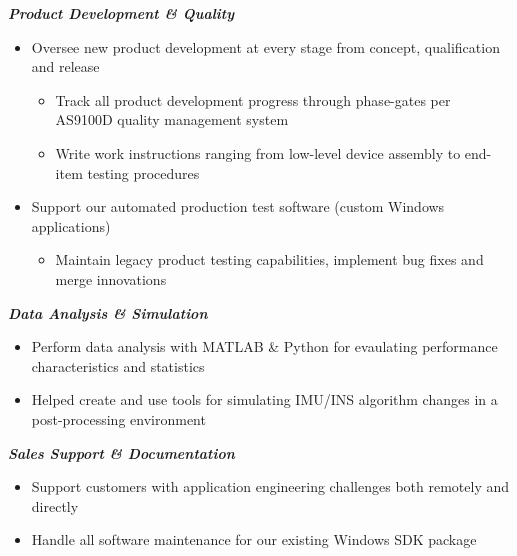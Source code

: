 \documentclass[]{article}
\begin{document}
\begin{singlespace}
\noindent\textbf{\emph{Product Development \& Quality}}
\vspace{-2mm}
\begin{itemize}
    \setlength\itemsep{0em}
    \item Oversee new product development at every stage from concept, qualification and release
    \vspace{-2mm}
    \begin{itemize}
        \setlength\itemsep{0em}
        \item Track all product development progress through phase-gates per AS9100D quality management system
        \item Write work instructions ranging from low-level device assembly to end-item testing procedures
    \end{itemize}
    \item Support our automated production test software (custom Windows applications)
    \vspace{-2mm}
    \begin{itemize}
        \setlength\itemsep{0em}
        \item Maintain legacy product testing capabilities, implement bug fixes and merge innovations
    \end{itemize}
\end{itemize}

\noindent\textbf{\emph{Data Analysis \& Simulation}}
\vspace{-2mm}
\begin{itemize}
    \setlength\itemsep{0em}
    \item Perform data analysis with MATLAB \& Python for evaulating performance characteristics and statistics
    \item Helped create and use tools for simulating IMU/INS algorithm changes in a post-processing environment
\end{itemize}

\noindent\textbf{\emph{Sales Support \& Documentation}}
\vspace{-2mm}
\begin{itemize}
    \setlength\itemsep{0em}
    \item Support customers with application engineering challenges both remotely and directly
    \item Handle all software maintenance for our existing Windows SDK package
\end{itemize}



\end{singlespace}
\end{document}
